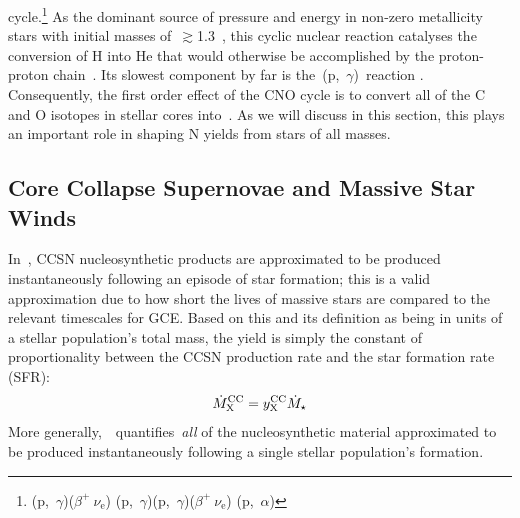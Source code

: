 \documentclass[ms.tex]{subfiles}
\begin{document}
cycle.\footnote{
	\Ctwelve(p,~$\gamma$)\Nthirteen($\beta^+~\nu_\text{e}$)\Cthirteen
	(p,~$\gamma$)\Nfourteen(p,~$\gamma$)\Ofifteen($\beta^+~\nu_\text{e}$)
	\Nfifteen(p,~$\alpha$)\Ctwelve
}
As the dominant source of pressure and energy in non-zero metallicity stars
with initial masses of~$\gtrsim$1.3~\msun, this cyclic nuclear reaction
catalyses the conversion of H into He that would otherwise be accomplished by
the proton-proton chain~\citep*{Suliga2021}.
Its slowest component by far is the~\Nfourteen(p,~$\gamma$)\Ofifteen~reaction
\citep[e.g.][]{LUNA2006}.
Consequently, the first order effect of the CNO cycle is to convert all of the
C and O isotopes in stellar cores into~\Nfourteen.
As we will discuss in this section, this plays an important role in shaping N
yields from stars of all masses.

\subsection{Core Collapse Supernovae and Massive Star Winds}
\label{sec:yields:ccsne}

In~\vice, CCSN nucleosynthetic products are approximated to be produced
instantaneously following an episode of star formation; this is a valid
approximation due to how short the lives of massive stars are compared to the
relevant timescales for GCE.
Based on this and its definition as being in units of a stellar population's
total mass, the yield is simply the constant of proportionality between the
CCSN production rate and the star formation rate (SFR):
\begin{equation}
\dot{M}_\text{X}^\text{CC} = y_\text{X}^\text{CC}\dot{M}_\star
\end{equation}
More generally,~~quantifies~\textit{all} of the nucleosynthetic material
approximated to be produced instantaneously following a single stellar
population's formation.
\end{document}
